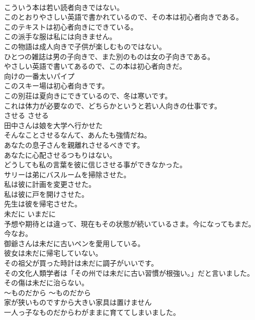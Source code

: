 \documentclass[8pt]{extreport}
\begin{document}
\begin{CJK}{UTF8}{min}
\\	こういう本は若い読者向きではない。   
\\	このとおりやさしい英語で書かれているので、その本は初心者向きである。   
\\	このテキストは初心者向きにできている。   
\\	この派手な服は私には向きません。   
\\	この物語は成人向きで子供が楽しむものではない。   
\\	ひとつの雑誌は男の子向きで、また別のものは女の子向きである。   
\\	やさしい英語で書いてあるので、この本は初心者向きだ。  
\\	向けの一番太いパイプ 
\\	このスキー場は初心者向きです。  
\\	この別荘は夏向きにできているので、冬は寒いです。  
\\	これは体力が必要なので、どちらかというと若い人向きの仕事です。  
\\	させる	させる	
\\	田中さんは娘を大学へ行かせた  
\\	そんなことさせるなんて、あんたも強情だね。  
\\	あなたの息子さんを親離れさせるべきです。  
\\	あなたに心配させるつもりはない。  
\\	どうしても私の言葉を彼に信じさせる事ができなかった。  
\\	サリーは弟にバスルームを掃除させた。  
\\	私は彼に計画を変更させた。  
\\	私は彼に戸を開けさせた。  
\\	先生は彼を帰宅させた。  
\\	未だに	いまだに	
\\	予想や期待とは違って、現在もその状態が続いているさま。今になってもまだ。今なお。	
\\	御爺さんは未だに古いペンを愛用している。  
\\	彼女は未だに帰宅していない。  
\\	その祖父が買った時計は未だに調子がいいです。  
\\	その文化人類学者は「その州では未だに古い習慣が根強い。」だと言いました。  
\\	その傷は未だに治らない。  
\\	〜ものだから	〜ものだから	
\\	家が狭いものですから大きい家具は置けません  
\\	一人っ子なものだからわがままに育ててしまいました。  

\end{CJK}
\end{document}
